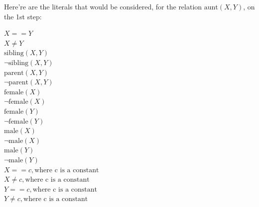 \documentclass[paper=a4, fontsize=11pt]{scrartcl} %
\numberwithin{equation}{section} %
\numberwithin{figure}{section} %
\numberwithin{table}{section} %
\begin{document}
Here're are the literals that would be considered, for the relation $\text{aunt}(X,Y)$, on the 1st step: 
\smallbreak

$X == Y$	\\
$X \neq Y$ \\ 
$\text{sibling}(X,Y)$ \\ 
$\neg \text{sibling}(X,Y)$ \\ 
$\text{parent}(X,Y)$ \\ 
$\neg \text{parent}(X,Y)$ \\ 
$\text{female}(X)$ \\ 
$\neg \text{female}(X)$ \\ 
$\text{female}(Y)$ \\ 
$\neg \text{female}(Y)$ \\ 
$\text{male}(X)$ \\ 
$\neg \text{male}(X)$ \\ 
$\text{male}(Y)$ \\ 
$\neg \text{male}(Y)$ \\ 
$X == c, \text{where c is a constant}$ \\ 
$X \neq c, \text{where c is a constant}$ \\ 
$Y == c, \text{where c is a constant}$ \\ 
$Y \neq c, \text{where c is a constant}$ 

\end{document}
